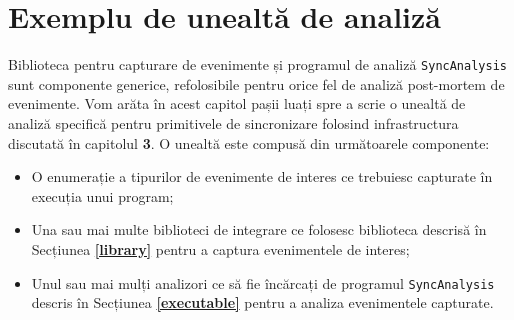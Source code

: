 \section{Exemplu de unealtă de analiză}

Biblioteca pentru capturare de evenimente și programul de analiză
\lstinline{SyncAnalysis} sunt componente generice, refolosibile
pentru orice fel de analiză post-mortem de evenimente. Vom arăta în
acest capitol pașii luați spre a scrie o unealtă de analiză specifică
pentru primitivele de sincronizare folosind infrastructura discutată în
capitolul \textbf{3}. O unealtă este compusă din următoarele componente:
\begin{itemize}
    \item O enumerație a tipurilor de evenimente de interes ce
    trebuiesc capturate în execuția unui program;
    \item Una sau mai multe biblioteci de integrare ce folosesc
    biblioteca descrisă în Secțiunea \textbf{\ref{library}} pentru a
    captura evenimentele de interes;
    \item Unul sau mai mulți analizori ce să fie încărcați de programul
    \lstinline{SyncAnalysis} descris în Secțiunea
    \textbf{\ref{executable}} pentru a analiza evenimentele capturate.
\end{itemize}








